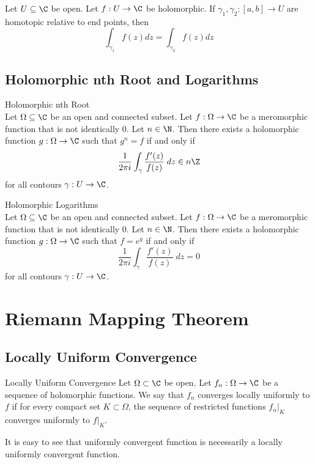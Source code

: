 \documentclass[a4paper]{article}
\begin{document}
\begin{thm}{}{} Let $U\subseteq\C$ be open. Let $f:U\to\C$ be holomorphic. If $\gamma_1,\gamma_2:[a,b]\to U$ are homotopic relative to end points, then $$\int_{\gamma_1}f(z)dz=\int_{\gamma_2}f(z)dz$$
\end{thm}

\subsection{Holomorphic nth Root and Logarithms}
\begin{thm}{Holomorphic nth Root}{}\\
Let $\Omega\subseteq\C$ be an open and connected subset. Let $f:\Omega\to\C$ be a meromorphic function that is not identically $0$. Let $n\in\N$. Then there exists a holomorphic function $g:\Omega\to\C$ such that $g^n=f$ if and only if $$\frac{1}{2\pi i}\int_\gamma\frac{f'(z)}{f(z)}\;dz\in n\Z$$ for all contours $\gamma:U\to\C$. 
\end{thm}

\begin{thm}{Holomorphic Logarithms}{}\\
Let $\Omega\subseteq\C$ be an open and connected subset. Let $f:\Omega\to\C$ be a meromorphic function that is not identically $0$. Let $n\in\N$. Then there exists a holomorphic function $g:\Omega\to\C$ such that $f=e^g$ if and only if $$\frac{1}{2\pi i}\int_\gamma\frac{f'(z)}{f(z)}\;dz=0$$ for all contours $\gamma:U\to\C$. 
\end{thm}

\pagebreak
\section{Riemann Mapping Theorem}
\subsection{Locally Uniform Convergence}
\begin{defn}{Locally Uniform Convergence}{} Let $\Omega\subset\C$ be open. Let $f_n:\Omega\to\C$ be a sequence of holomorphic functions. We say that $f_n$ converges locally uniformly to $f$ if for every compact set $K\subset\Omega$, the sequence of restricted functions $f_n|_K$ converges uniformly to $f|_K$. 
\end{defn}

It is easy to see that uniformly convergent function is necessarily a locally uniformly convergent function. 
\end{document}
